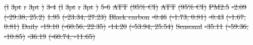 \documentclass[
  letterpaper,
  DIV=11,
  numbers=noendperiod]{scrartcl}
\makeatletter
\renewenvironment{table}%
   {\renewcommand\familydefault\sfdefault
    \@float{table}}
   {\end@float}
\providecommand{\DIFdeltex}[1]{{\protect\color{red}\sout{#1}}}                      %
\providecommand{\DIFdelFL}[1]{\DIFdel{#1}} %
\providecommand{\DIFdelbeginFL}{} %
\providecommand{\DIFdel}[1]{\texorpdfstring{\DIFdeltex{#1}}{}} %
\newcommand{\DIFscaledelfig}{0.5}
\newlength{\DIFdelgraphicswidth} %
\newlength{\DIFdelgraphicsheight} %
\newcommand{\DIFdelincludegraphics}[2][]{%
\sbox{\DIFdelgraphicsbox}{\DIFOincludegraphics[#1]{#2}}%
\settoboxwidth{\DIFdelgraphicswidth}{\DIFdelgraphicsbox} %
\settoboxtotalheight{\DIFdelgraphicsheight}{\DIFdelgraphicsbox} %
\scalebox{\DIFscaledelfig}{%
\parbox[b]{\DIFdelgraphicswidth}{\usebox{\DIFdelgraphicsbox}\\[-\baselineskip] \rule{\DIFdelgraphicswidth}{0em}}\llap{\resizebox{\DIFdelgraphicswidth}{\DIFdelgraphicsheight}{%
\setlength{\unitlength}{\DIFdelgraphicswidth}%
\begin{picture}(1,1)%
\thicklines\linethickness{2pt} %
{\color[rgb]{1,0,0}\put(0,0){\framebox(1,1){}}}%
{\color[rgb]{1,0,0}\put(0,0){\line( 1,1){1}}}%
{\color[rgb]{1,0,0}\put(0,1){\line(1,-1){1}}}%
\end{picture}%
}\hspace*{3pt}}} %
} %
\DeclareRobustCommand{\DIFdelbeginFL}{\DIFOdelbeginFL \let\includegraphics\DIFdelincludegraphics} %
\makeatother
\begin{document}
\begin{table}
\DIFdelbeginFL %
\DIFdelFL{(l}%
\DIFdelFL{3pt}%
\DIFdelFL{r}%
\DIFdelFL{3pt}%
\DIFdelFL{)}%
\DIFdelFL{3-4}%
\DIFdelFL{(l}%
\DIFdelFL{3pt}%
\DIFdelFL{r}%
\DIFdelFL{3pt}%
\DIFdelFL{)}%
\DIFdelFL{5-6}%
\DIFdelFL{ATT }%
\DIFdelFL{(95\% CI) }%
\DIFdelFL{ATT }%
\DIFdelFL{(95\% CI)}%
\DIFdelFL{\hspace{1em} }%
\DIFdelFL{PM2.5 }%
\DIFdelFL{-2.09 }%
\DIFdelFL{(-29.38, 25.2) }%
\DIFdelFL{1.95 }%
\DIFdelFL{(-23.34, 27.23)}%
\DIFdelFL{Black carbon }%
\DIFdelFL{-0.46 }%
\DIFdelFL{(-1.73, 0.81) }%
\DIFdelFL{-0.43 }%
\DIFdelFL{(-1.67, 0.81)}%
\DIFdelFL{\hspace{1em} }%
\DIFdelFL{Daily }%
\DIFdelFL{-19.10 }%
\DIFdelFL{(-60.56, 22.35) }%
\DIFdelFL{-14.20 }%
\DIFdelFL{(-53.94, 25.54)}%
\DIFdelFL{Seasonal }%
\DIFdelFL{-35.11 }%
\DIFdelFL{(-59.36, -10.85) }%
\DIFdelFL{-36.19 }%
\DIFdelFL{(-60.74, -11.65)}%

\end{table}
\end{document}
